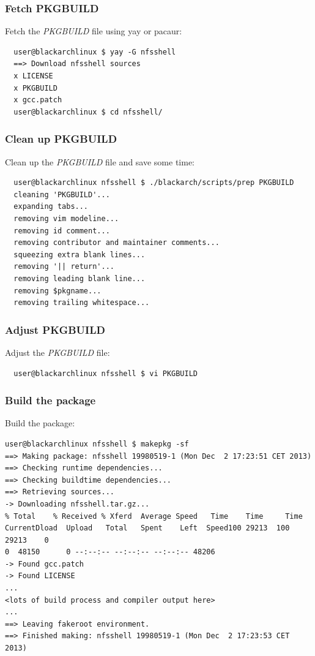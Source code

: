 \documentclass[a4paper, oneside, 11pt]{book}
\begin{document}
\subsubsection{Fetch PKGBUILD}
Fetch the \textit{PKGBUILD} file using yay or pacaur:
\begin{lstlisting}
  user@blackarchlinux $ yay -G nfsshell
  ==> Download nfsshell sources
  x LICENSE
  x PKGBUILD
  x gcc.patch
  user@blackarchlinux $ cd nfsshell/
\end{lstlisting}

\subsubsection{Clean up PKGBUILD}
Clean up the \textit{PKGBUILD} file and save some time:
\begin{lstlisting}
  user@blackarchlinux nfsshell $ ./blackarch/scripts/prep PKGBUILD
  cleaning 'PKGBUILD'...
  expanding tabs...
  removing vim modeline...
  removing id comment...
  removing contributor and maintainer comments...
  squeezing extra blank lines...
  removing '|| return'...
  removing leading blank line...
  removing $pkgname...
  removing trailing whitespace...
\end{lstlisting}

\subsubsection{Adjust PKGBUILD}
Adjust the \textit{PKGBUILD} file:
\begin{lstlisting}
  user@blackarchlinux nfsshell $ vi PKGBUILD
\end{lstlisting}

\subsubsection{Build the package}
Build the package:
\begin{lstlisting}user@blackarchlinux nfsshell $ makepkg -sf
==> Making package: nfsshell 19980519-1 (Mon Dec  2 17:23:51 CET 2013)
==> Checking runtime dependencies...
==> Checking buildtime dependencies...
==> Retrieving sources...
-> Downloading nfsshell.tar.gz...
% Total    % Received % Xferd  Average Speed   Time    Time     Time
CurrentDload  Upload   Total   Spent    Left  Speed100 29213  100 29213    0
0  48150      0 --:--:-- --:--:-- --:--:-- 48206
-> Found gcc.patch
-> Found LICENSE
...
<lots of build process and compiler output here>
...
==> Leaving fakeroot environment.
==> Finished making: nfsshell 19980519-1 (Mon Dec  2 17:23:53 CET 2013)
\end{lstlisting}
\end{document}
